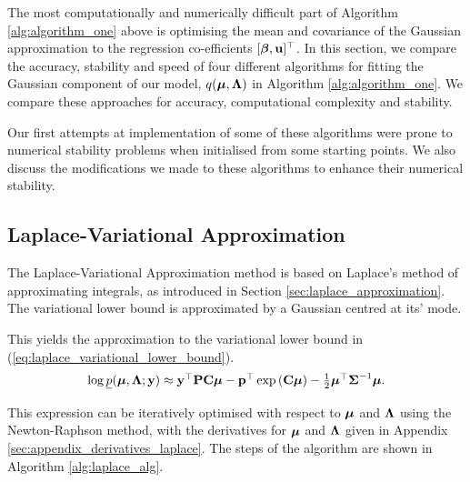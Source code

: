 The most computationally and numerically difficult part of Algorithm \ref{alg:algorithm_one} above is
optimising the mean and covariance of the Gaussian approximation to the regression co-efficients $[{\boldsymbol \beta},
{\bf u}]^\top$. In this section, we compare the accuracy, stability and speed of four different algorithms for
fitting the Gaussian component of our model, $q({\boldsymbol \mu}, {\boldsymbol \Lambda})$ in Algorithm \ref{alg:algorithm_one}.  We
compare these approaches for accuracy, computational complexity and stability.

Our first attempts at implementation of some of these algorithms were prone to numerical stability problems
when initialised from some starting points. We also discuss the modifications we made to these algorithms to
enhance their numerical stability.
	
\subsection{Laplace-Variational Approximation}
The Laplace-Variational Approximation method is based on Laplace's method of approximating integrals, as
introduced in Section \ref{sec:laplace_approximation}. The variational lower bound  is approximated by a
Gaussian centred at its' mode.

This yields the approximation to the variational lower bound in (\ref{eq:laplace_variational_lower_bound}).
\begin{equation}
\label{eq:laplace_variational_lower_bound}
\begin{array}{ll}
	\log \underline{p}({\boldsymbol \mu}, {\boldsymbol \Lambda}; {\bf y}) \approx {\bf y}^\top{\bf P}{\bf C}{\boldsymbol\mu} - {\bf p}^\top\exp \left ({\bf C} {\boldsymbol \mu} \right ) - \tfrac{1}{2} {\boldsymbol \mu}^\top {\boldsymbol\Sigma}^{-1} {\boldsymbol \mu}. 
\end{array}
\end{equation}
		
\noindent This expression can be iteratively optimised with respect to ${\boldsymbol \mu}$ and ${\boldsymbol \Lambda}$ using the
Newton-Raphson method, with the derivatives for ${\boldsymbol \mu}$ and ${\boldsymbol \Lambda}$ given in Appendix
\ref{sec:appendix_derivatives_laplace}. The steps of the algorithm are shown in Algorithm \ref{alg:laplace_alg}.
		
